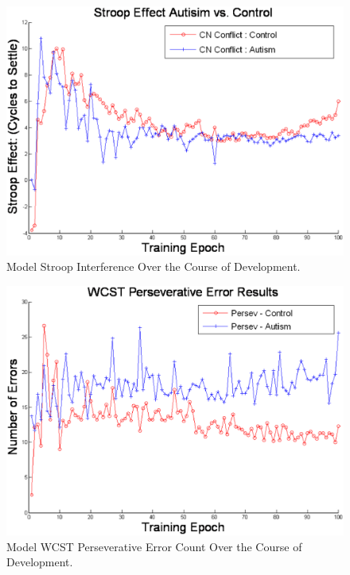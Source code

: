\begin{figure}[t]
\begin{center}
	\includegraphics[width=145mm]{graphs/stroop_devel.eps}
\end{center}
\caption{Model Stroop Interference Over the Course of Development.} 
\label{stroop-devel-figure}
\end{figure} 

\begin{figure}[t]
\begin{center}
	\includegraphics[width=145mm]{graphs/wcst_devel_persev.eps}
\end{center}
\caption{Model WCST Perseverative Error Count Over the Course of Development.} 
\label{wcst-devel-figure}
\end{figure} 


